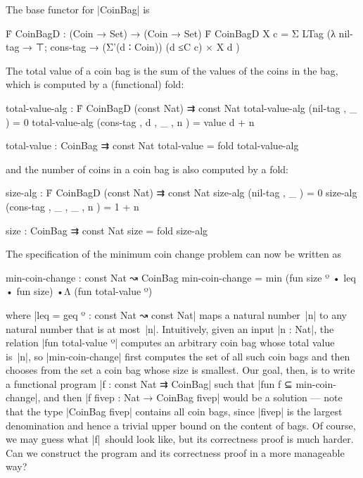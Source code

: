 The base functor for |CoinBag| is
\begin{code}
Ḟ CoinBagD : (Coin → Set) → (Coin → Set)
Ḟ CoinBagD X c =
  Σ LTag (λ { nil-tag → ⊤; cons-tag → (Σ'(d ∶ Coin)) (d ≤C c) × X d })
\end{code}
The total value of a coin bag is the sum of the values of the coins in the bag, which is computed by a (functional) fold:
\begin{code}
total-value-alg : Ḟ CoinBagD (const Nat) ⇉ const Nat
total-value-alg (nil-tag   , _          )  =  0
total-value-alg (cons-tag  , d , _ , n  )  =  value d + n

total-value : CoinBag ⇉ const Nat
total-value = fold total-value-alg
\end{code}
and the number of coins in a coin bag is also computed by a fold:
\begin{code}
size-alg : Ḟ CoinBagD (const Nat) ⇉ const Nat
size-alg (nil-tag   , _          )  =  0
size-alg (cons-tag  , _ , _ , n  )  =  1 + n

size : CoinBag ⇉ const Nat
size = fold size-alg
\end{code}
The specification of the minimum coin change problem can now be written as
\begin{code}
min-coin-change : const Nat ↝ CoinBag
min-coin-change =
  min (fun size º • leq • fun size) •Λ (fun total-value º)
\end{code}
where |leq = geq º : const Nat ↝ const Nat| maps a natural number~|n| to any natural number that is at most~|n|.
Intuitively, given an input |n : Nat|, the relation |fun total-value º| computes an arbitrary coin bag whose total value is~|n|, so |min-coin-change| first computes the set of all such coin bags and then chooses from the set a coin bag whose size is smallest.
Our goal, then, is to write a functional program |f : const Nat ⇉ CoinBag| such that |fun f ⊆ min-coin-change|, and then |f fivep : Nat → CoinBag fivep| would be a solution --- note that the type |CoinBag fivep| contains all coin bags, since |fivep| is the largest denomination and hence a trivial upper bound on the content of bags.
Of course, we may guess what |f|~should look like, but its correctness proof is much harder.
Can we construct the program and its correctness proof in a more manageable way?

